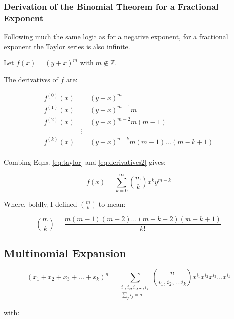 \subsubsection{Derivation of the Binomial Theorem for a Fractional Exponent}

Following much the same logic as for a negative exponent, for a fractional exponent the Taylor series is also infinite. 

Let $f(x) = (y+x)^{m}$ with $m\notin \mathbb{Z}$. 

The derivatives of $f$ are:

\begin{equation}
\begin{array}{ll}
f^{(0)}(x) &= (y+x)^{m}\\
f^{(1)}(x) &= (y+x)^{m-1}m\\
f^{(2)}(x) &= (y+x)^{m-2}m(m-1)\\
&\vdots\\
f^{(k)}(x) &= (y+x)^{n-k}m(m-1)\hdots	(m-k+1)\\
\end{array}
\label{eq:derivatives2}
\end{equation} 

Combing Eqns. \ref{eq:taylor} and \ref{eq:derivatives2} gives:

\begin{equation}
f(x) = \sum_{k=0}^\infty { m \choose k } x^k y^{m-k}
\end{equation}

Where, boldly, I defined ${ m \choose k}$ to mean:

\begin{equation}
{m \choose k} = \frac{m(m-1)(m-2)\hdots(m-k+2)(m-k+1)}{k!}
\end{equation}



\subsection{Multinomial Expansion}

\begin{equation}
(x_1 + x_2 + x_3 + \hdots + x_k)^n = \sum_{\begin{array}{c} i_1,i_2,i_3,\hdots,i_k \\ \sum_j i_j = n\end{array}} {n \choose i_1,i_2,\hdots i_k}x^{i_1}x^{i_2}x^{i_3}\hdots x^{i_k}
\end{equation}

with:

